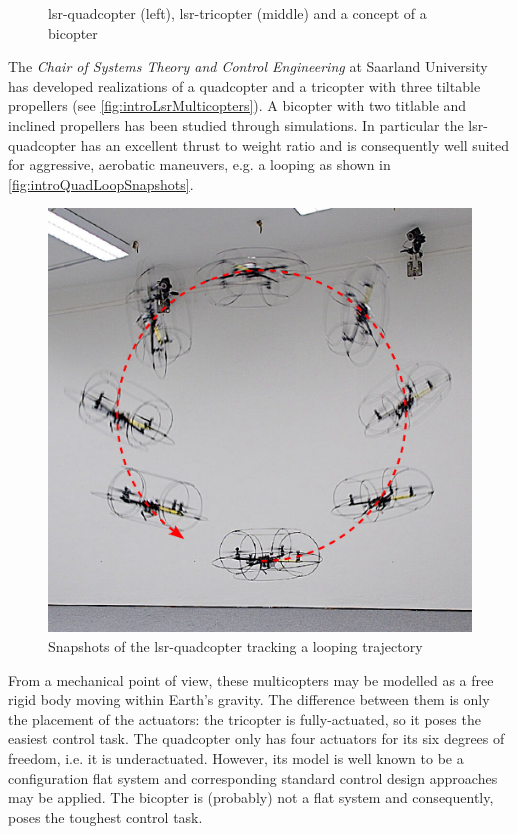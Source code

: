 \begin{figure}[ht]
 \centering
 
 \caption{lsr-quadcopter (left), lsr-tricopter (middle) and a concept of a bicopter}
 \label{fig:introLsrMulticopters}
\end{figure}

The \textit{Chair of Systems Theory and Control Engineering} at Saarland University has developed realizations of a quadcopter and a tricopter with three tiltable propellers (see \autoref{fig:introLsrMulticopters}).
A bicopter with two titlable and inclined propellers has been studied through simulations.
In particular the lsr-quadcopter has an excellent thrust to weight ratio and is consequently well suited for aggressive, aerobatic maneuvers, e.g. a looping as shown in \autoref{fig:introQuadLoopSnapshots}.

\begin{figure}[ht]
 \centering
 \includegraphics{graphics/QuadLoopSnapshots}
 \caption{Snapshots of the lsr-quadcopter tracking a looping trajectory}
 \label{fig:introQuadLoopSnapshots}
\end{figure}

From a mechanical point of view, these multicopters may be modelled as a free rigid body moving within Earth's gravity.
The difference between them is only the placement of the actuators:
the tricopter is fully-actuated, so it poses the easiest control task.
The quadcopter only has four actuators for its six degrees of freedom, i.e. it is underactuated.
However, its model is well known to be a configuration flat system and corresponding standard control design approaches may be applied.
The bicopter is (probably) not a flat system and consequently, poses the toughest control task.


